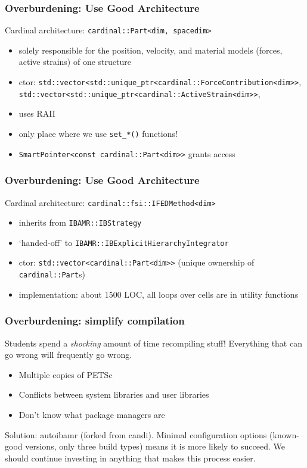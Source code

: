 \documentclass[8pt]{beamer}
\begin{document}
\begin{frame}
  \frametitle{Overburdening: Use Good Architecture}

    Cardinal architecture: \texttt{cardinal::Part<dim, spacedim>}
    \begin{itemize}
      \item solely responsible for the position, velocity, and material models
        (forces, active strains) of one structure
      \item ctor: \texttt{std::vector<std::unique\_ptr<cardinal::ForceContribution<dim>>},
        \texttt{std::vector<std::unique\_ptr<cardinal::ActiveStrain<dim>>},
      \item uses RAII
      \item only place where we use \texttt{set\_*()} functions!
      \item \texttt{SmartPointer<const cardinal::Part<dim>>} grants access
    \end{itemize}
\end{frame}

\begin{frame}
  \frametitle{Overburdening: Use Good Architecture}

    Cardinal architecture: \texttt{cardinal::fsi::IFEDMethod<dim>}
    \begin{itemize}
      \item inherits from \texttt{IBAMR::IBStrategy}
      \item `handed-off' to \texttt{IBAMR::IBExplicitHierarchyIntegrator}
      \item ctor: \texttt{std::vector<cardinal::Part<dim>>} (unique ownership of
        \texttt{cardinal::Part}s)
      \item implementation: about 1500 LOC, all loops over cells are in utility functions
    \end{itemize}
\end{frame}

\begin{frame}
  \frametitle{Overburdening: simplify compilation}
  Students spend a \emph{shocking} amount of time recompiling stuff! Everything
  that can go wrong will frequently go wrong.

  \begin{itemize}
    \item Multiple copies of PETSc
    \item Conflicts between system libraries and user libraries
    \item Don't know what package managers are
  \end{itemize}

  Solution: autoibamr (forked from candi). Minimal configuration options
  (known-good versions, only three build types) means it is more likely to
  succeed. We should continue investing in anything that makes this process
  easier.
\end{frame}
\end{document}
